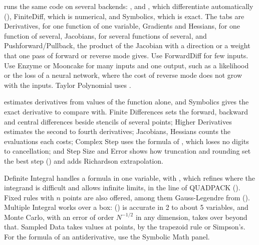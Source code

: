  runs the same code on several backends: ,  and , which differentiate automatically (), FiniteDiff, which is numerical, and Symbolics, which is exact. The tabs are Derivatives, for one function of one variable, Gradients and Hessians, for one function of several, Jacobians, for several functions of several, and Pushforward/Pullback, the product of the Jacobian with a direction or a weight that one pass of forward or reverse mode gives. Use ForwardDiff for few inputs. Use Enzyme or Mooncake for many inputs and one output, such as a likelihood or the loss of a neural network, where the cost of reverse mode does not grow with the inputs. Taylor Polynomial uses .

 estimates derivatives from values of the function alone, and Symbolics gives the exact derivative to compare with. Finite Differences sets the forward, backward and central differences beside stencils of several points; Higher Derivatives estimates the second to fourth derivatives; Jacobians, Hessians counts the evaluations each costs; Complex Step uses the formula of , which loses no digits to cancellation; and Step Size and Error shows how truncation and rounding set the best step () and adds Richardson extrapolation.

Definite Integral handles a formula in one variable, with , which refines where the integrand is difficult and allows infinite limits, in the line of QUADPACK (). Fixed rules with $n$ points are also offered, among them Gauss-Legendre from  (). Multiple Integral works over a box:  () is accurate in 2 to about 5 variables, and Monte Carlo, with an error of order $N^{-1/2}$ in any dimension, takes over beyond that. Sampled Data takes values at points, by the trapezoid rule or Simpson's. For the formula of an antiderivative, use the Symbolic Math panel.

